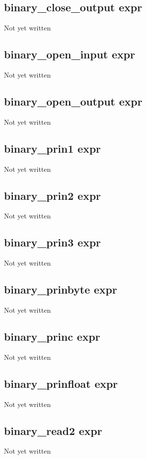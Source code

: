 \documentclass[a4paper,11pt]{article}
\begin{document}
\subsection{\ttfamily binary\_close\_output expr}
Not yet written

\subsection{\ttfamily binary\_open\_input expr}
Not yet written

\subsection{\ttfamily binary\_open\_output expr}
Not yet written

\subsection{\ttfamily binary\_prin1 expr}
Not yet written

\subsection{\ttfamily binary\_prin2 expr}
Not yet written

\subsection{\ttfamily binary\_prin3 expr}
Not yet written

\subsection{\ttfamily binary\_prinbyte expr}
Not yet written

\subsection{\ttfamily binary\_princ expr}
Not yet written

\subsection{\ttfamily binary\_prinfloat expr}
Not yet written

\subsection{\ttfamily binary\_read2 expr}
Not yet written
\end{document}
